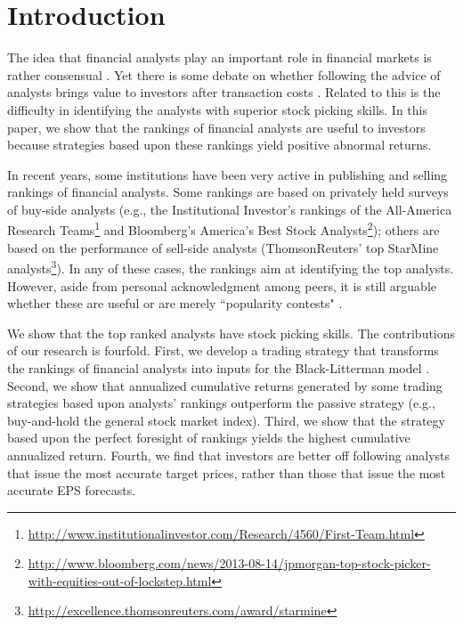 \documentclass{article}
\begin{document}
\section{Introduction}
\label{sec:intro}

The idea that financial analysts play an important role in financial markets is rather consensual \citep{cowles1933csm,obrien1990}. Yet there is some debate on whether following the advice of analysts brings value to investors after transaction costs \citep{womack1996,mikhail2004sae,li2005persistence}. Related to this is the difficulty in identifying the analysts with superior stock picking skills. In this paper, we show that the rankings of financial analysts are useful to investors because strategies based upon these rankings yield positive abnormal returns.



In recent years, some institutions have been very active in publishing and  selling  rankings of financial analysts. Some rankings  are based on privately held surveys of  buy-side analysts (e.g., the Institutional Investor's rankings of the All-America Research Teams\footnote{\url{http://www.institutionalinvestor.com/Research/4560/First-Team.html}} and Bloomberg's America's Best Stock Analysts\footnote{\sloppy \url{http://www.bloomberg.com/news/2013-08-14/jpmorgan-top-stock-picker-with-equities-out-of-lockstep.html}}); others are based on the performance of sell-side analysts (ThomsonReuters' top StarMine analysts\footnote{\url{http://excellence.thomsonreuters.com/award/starmine}}). In any of these cases, the rankings aim at identifying the top analysts. However, aside from personal acknowledgment among peers, it is still arguable whether these are useful \citep{desai2000ass} or are merely ``popularity contests" \citep{emery2009}. %


We show that the top ranked analysts have stock picking skills. The contributions of our research is fourfold. First, we develop a trading strategy that transforms the rankings of financial analysts into inputs for the Black-Litterman model \citep{black1992}. Second, we show that annualized cumulative returns generated by some trading strategies  based upon analysts' rankings outperform the passive strategy (e.g., buy-and-hold the general stock market index). Third, we show that the strategy based upon the perfect foresight of rankings yields the highest cumulative annualized return. Fourth, we find that investors  are better off following analysts that issue the most accurate target prices, rather than those that issue the most accurate EPS forecasts.
\end{document}
